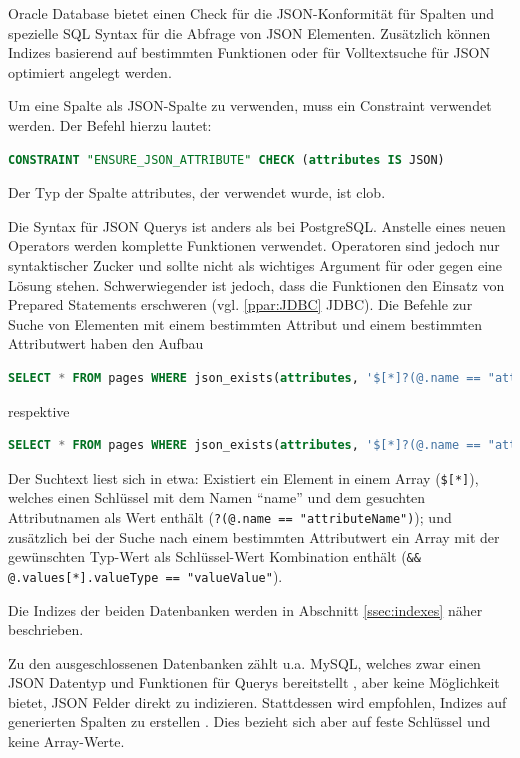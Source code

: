 Oracle Database bietet einen Check für die JSON-Konformität für Spalten und spezielle SQL Syntax für die Abfrage von JSON Elementen. Zusätzlich können Indizes basierend auf bestimmten Funktionen oder für Volltextsuche für JSON optimiert angelegt werden.  \cite{OracleHelpCenter.2019}

Um eine Spalte als JSON-Spalte zu verwenden, muss ein Constraint verwendet werden. Der Befehl hierzu lautet:
\begin{lstlisting}[language=SQL,caption={Oracle Database JSON Constraint}]
CONSTRAINT "ENSURE_JSON_ATTRIBUTE" CHECK (attributes IS JSON)
\end{lstlisting}
Der Typ der Spalte attributes, der verwendet wurde, ist clob.

Die Syntax für JSON Querys ist anders als bei PostgreSQL. Anstelle eines neuen Operators werden komplette Funktionen verwendet. Operatoren sind jedoch nur syntaktischer Zucker und sollte nicht als wichtiges Argument für oder gegen eine Lösung stehen. Schwerwiegender ist jedoch, dass die Funktionen den Einsatz von Prepared Statements erschweren (vgl. \ref{ppar:JDBC} JDBC). Die Befehle zur Suche von Elementen mit einem bestimmten Attribut und einem bestimmten Attributwert haben den Aufbau 
\begin{lstlisting}[language=SQL,caption={Oracle Database, FindByAttribute-Query}]
SELECT * FROM pages WHERE json_exists(attributes, '$[*]?(@.name == "attributeName")')
\end{lstlisting}
 respektive 
 \begin{lstlisting}[language=SQL,caption={Oracle Database, FindByValue-Query}]
SELECT * FROM pages WHERE json_exists(attributes, '$[*]?(@.name == "attributeName" && @.values[*].value.Type == "value.Value")'
\end{lstlisting}

Der Suchtext liest sich in etwa: Existiert ein Element in einem Array (\lstinline|$[*]|), welches einen Schlüssel mit dem Namen ``name'' und dem gesuchten Attributnamen als Wert enthält (\lstinline|?(@.name == "attributeName")|); und zusätzlich bei der Suche nach einem bestimmten Attributwert ein Array mit der gewünschten Typ-Wert als Schlüssel-Wert Kombination enthält (\lstinline|&& @.values[*].valueType == "valueValue"|).
 
Die Indizes der beiden Datenbanken werden in Abschnitt \ref{ssec:indexes} näher beschrieben.

Zu den ausgeschlossenen Datenbanken zählt u.a. MySQL, welches zwar einen JSON Datentyp und Funktionen für Querys bereitstellt \cite{.10.07.2021}, aber keine Möglichkeit bietet, JSON Felder direkt zu indizieren. Stattdessen wird empfohlen, Indizes auf generierten Spalten zu erstellen \cite{.10.07.2021b}. Dies bezieht sich aber auf feste Schlüssel und keine Array-Werte.


